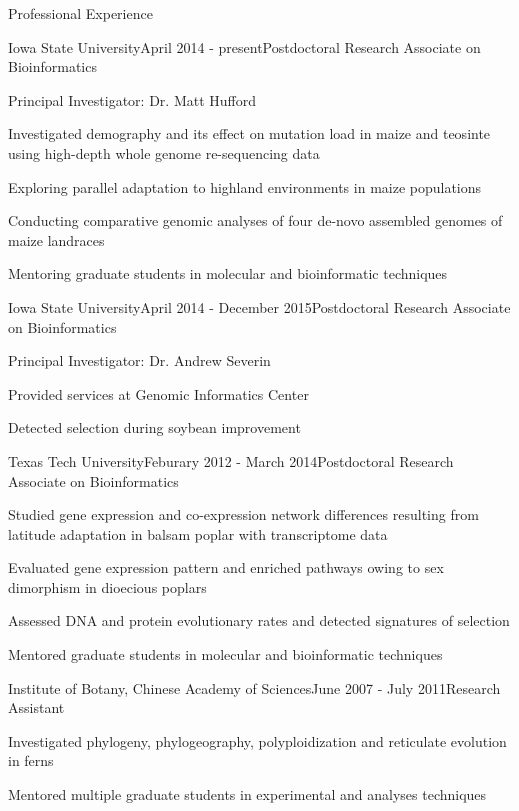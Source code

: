 \documentclass{resume} %
\begin{document}
\begin{rSection}{Professional Experience}

\begin{rSubsection}{Iowa State University}{April 2014 - present}{Postdoctoral Research Associate on Bioinformatics}{}
\item Principal Investigator:  Dr. Matt Hufford
\item Investigated demography and its effect on mutation load in maize and teosinte using high-depth whole genome re-sequencing data
\item Exploring parallel adaptation to highland environments in maize populations
\item Conducting comparative genomic analyses of four de-novo assembled genomes of maize landraces
\item Mentoring graduate students in molecular and bioinformatic techniques
\end{rSubsection}

\begin{rSubsection}{Iowa State University}{April 2014 - December 2015}{Postdoctoral Research Associate on Bioinformatics}{}
\item Principal Investigator:  Dr. Andrew Severin
\item Provided services at Genomic Informatics Center
\item Detected selection during soybean improvement
\end{rSubsection}

\begin{rSubsection}{Texas Tech University}{Feburary 2012 - March 2014}{Postdoctoral Research Associate on Bioinformatics}{}
\item Studied gene expression and co-expression network differences resulting from latitude adaptation in balsam poplar with transcriptome data
\item Evaluated gene expression pattern and enriched pathways owing to sex dimorphism in dioecious poplars
\item Assessed DNA and protein evolutionary rates and detected signatures of selection
\item Mentored graduate students in molecular and bioinformatic techniques
\end{rSubsection}

\begin{rSubsection}{Institute of Botany, Chinese Academy of Sciences}{June 2007 - July 2011}{Research Assistant}{}
\item Investigated phylogeny, phylogeography, polyploidization and reticulate evolution in ferns
\item Mentored multiple graduate students in experimental and analyses techniques
\end{rSubsection}


\end{rSection}
\end{document}
